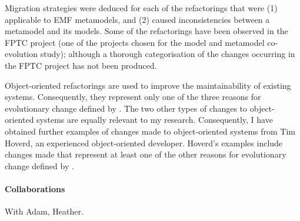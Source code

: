 Migration strategies were deduced for each of the refactorings that were (1) applicable to EMF metamodels, and (2) caused inconsistencies between a metamodel and its models. Some of the refactorings have been observed in the FPTC project (one of the projects chosen for the model and metamodel co-evolution study); although a thorough categorisation of the changes occurring in the FPTC project has not been produced.

Object-oriented refactorings are used to improve the maintainability of existing systems. Consequently, they represent only one of the three reasons for evolutionary change defined by \cite{sjoberg93quantifying}. The two other types of changes to object-oriented systems are equally relevant to my research. Consequently, I have obtained further examples of changes made to object-oriented systems from Tim Hoverd, an experienced object-oriented developer. Hoverd's examples include changes made that represent at least one of the other reasons for evolutionary change defined by \cite{sjoberg93quantifying}.



\paragraph{Collaborations} %
\label{par:collaborations}
With Adam, Heather.







